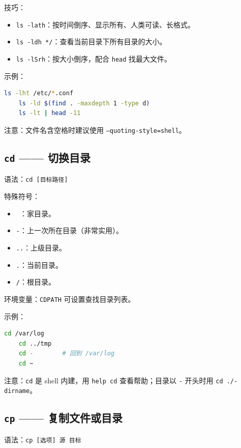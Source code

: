 技巧：
\begin{itemize}
\item \texttt{ls -lath}：按时间倒序、显示所有、人类可读、长格式。
\item \texttt{ls -ldh */}：查看当前目录下所有目录的大小。
\item \texttt{ls -lSrh}：按大小倒序，配合 \texttt{head} 找最大文件。
\end{itemize}

示例：
\begin{lstlisting}[language=bash]
	ls -lht /etc/*.conf
	ls -ld $(find . -maxdepth 1 -type d)
	ls -lt | head -11
\end{lstlisting}

注意：文件名含空格时建议使用 \texttt{--quoting-style=shell}。

\subsection*{\texttt{cd} —— 切换目录} 语法：\texttt{cd [目标路径]}

特殊符号：
\begin{itemize}
\item \texttt{\string~}：家目录。
\item \texttt{-}：上一次所在目录（非常实用）。
\item \texttt{..}：上级目录。
\item \texttt{.}：当前目录。
\item \texttt{/}：根目录。
\end{itemize}

环境变量：\texttt{CDPATH} 可设置查找目录列表。

示例：
\begin{lstlisting}[language=bash]
	cd /var/log
	cd ../tmp
	cd -        # 回到 /var/log
	cd ~
\end{lstlisting}

注意：\texttt{cd} 是 shell 内建，用 \texttt{help cd} 查看帮助；目录以 \texttt{-} 开头时用 \texttt{cd ./-dirname}。

\subsection*{\texttt{cp} —— 复制文件或目录} 语法：\texttt{cp [选项] 源 目标}

